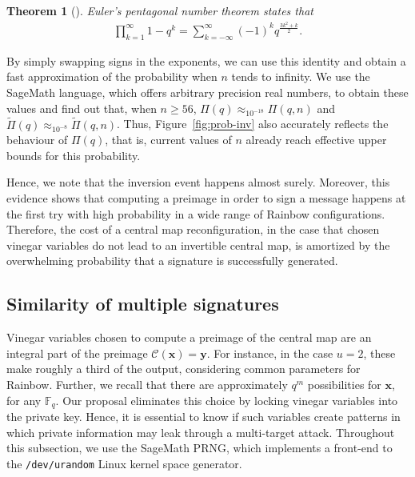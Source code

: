 \documentclass[12pt, a4paper, oneside]{memoir}
\newtheorem{theorem}{Theorem}[section]
\theoremstyle{definition}
\begin{document}
\begin{theorem}[{\cite[Thm.~14.3]{Apostol:2010}}]
  Euler's pentagonal number theorem states that
  \begin{align}
    \prod_{k = 1}^{\infty} 1 - q^{k} = \sum_{k = -\infty}^{\infty}
    {(-1)}^{k} q^{\frac{3k^{2} + k}{2}}.
  \end{align}
\end{theorem}

By simply swapping signs in the exponents, we can use this identity and obtain a fast approximation of the probability when $n$ tends to infinity. We use the SageMath language, which offers arbitrary precision real numbers, to obtain these values and find out that, when $n \geq 56$, $\Pi(q) \approx_{10^{-18}} \Pi(q, n)$ and $\widetilde{\Pi}(q) \approx_{10^{-8}} \widetilde{\Pi}(q, n)$. Thus, Figure~\ref{fig:prob-inv} also accurately reflects the behaviour of $\Pi(q)$, that is, current values of $n$ already reach effective upper bounds for this probability.

Hence, we note that the inversion event happens almost surely. Moreover, this evidence shows that computing a preimage in order to sign a message happens at the first try with high probability in a wide range of Rainbow configurations. Therefore, the cost of a central map reconfiguration, in the case that chosen vinegar variables do not lead to an invertible central map, is amortized by the overwhelming probability that a signature is successfully generated.

\subsection{Similarity of multiple signatures}\label{subsec:similar}

Vinegar variables chosen to compute a preimage of the central map are an integral part of the
preimage $\mathcal{C}(\mathbf{x}) = \mathbf{y}$. For instance, in the case $u = 2$, these make roughly a third of the output, considering common parameters for Rainbow. Further, we recall that there are approximately $q^{m}$ possibilities for $\mathbf{x}$, for any $\mathbb{F}_{q}$. Our proposal eliminates this choice by locking vinegar variables into the private key. Hence, it is essential to know if such variables create patterns in which private information may leak through a multi-target attack. Throughout this subsection, we use the SageMath PRNG, which implements a front-end to the \texttt{/dev/urandom} Linux kernel space generator.
\end{document}
